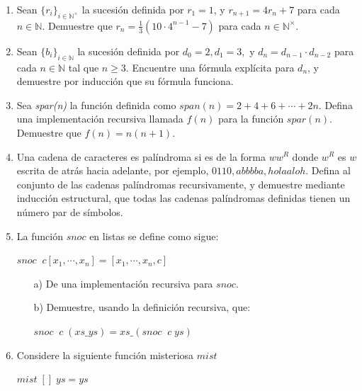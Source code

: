 \documentclass[letterpaper,11pt]{article}
\begin{document}
\begin{enumerate}
    \item Sean $\{r_{i}\}_{i \in ℕ^{\times}}$ la sucesión definida por 
    $r_{1} = 1$, y $r_{n + 1} = 4r_{n} + 7$ para cada $n \in ℕ$. 
    Demuestre que $r_{n} = \frac{1}{3}(10 \cdot 4^{n - 1} - 7)$ para cada 
    $n \in ℕ^{\times}$. 

    \item Sean $\{b_{i}\}_{i \in ℕ}$ la sucesión definida por $d_{0} = 2, 
    d_{1} = 3, $ y $d_{n} = d_{n-1} \cdot d_{n-2}$ para cada $n \in ℕ$ tal que 
    $n \geq 3$. Encuentre una fórmula explícita para $d_{n}$, y demuestre por 
    inducción que su fórmula funciona.

    \item Sea \textit{spar(n)} la función definida como $span(n) = 2 + 4 + 6 +
    ⋯ + 2n$. Defina una implementación recursiva llamada $f(n)$ para la función 
    $spar(n)$. Demuestre que $f(n) = n(n + 1)$.

    \item Una cadena de caracteres es palíndroma si es de la forma $ww^{R}$ 
    donde $w^{R}$ es $w$ escrita de atrás hacia adelante, por ejemplo, $0110,
    abbbba, holaaloh$. Defina al conjunto de las cadenas palíndromas 
    recursivamente, y demuestre mediante inducción estructural, que todas las 
    cadenas palíndromas definidas tienen un número par de símbolos. 

    \item La función $snoc$ en listas se define como sigue:
    \begin{center}
        $snoc \; \; c[x_{1}, ⋯, x_{n}] = [x_{1}, ⋯, x_{n}, c]$
    \end{center}

    \begin{itemize}
        \item[a)] De una implementación recursiva para $snoc$.
        \item[b)] Demuestre, usando la definición recursiva, que:
        \begin{center}
            $snoc \; \; c \; (xs\_ys) = xs\_ (snoc \; \; c \; ys)$
        \end{center} 
    \end{itemize}

    \item Considere la siguiente función misteriosa $mist$
    \begin{center}
        $mist \; [] \; ys = ys$


\end{center}
\end{enumerate}
\end{document}
